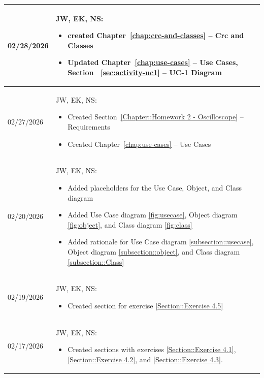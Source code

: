 \begin{longtable}{|l||p{13.5cm}|}
02/28/2026 & 
JW, EK, NS:
\begin{itemize}[topsep=0pt,itemsep=0pt,parsep=0pt,partopsep=0pt,leftmargin=12pt]
\item created Chapter~\ref{chap:crc-and-classes} -- Crc and Classes
\item Updated Chapter~\ref{chap:use-cases} -- Use Cases, Section ~\ref{sec:activity-uc1} -- UC-1 Diagram
\end{itemize}
\\ \hline

02/27/2026 & 
JW, EK, NS:
\begin{itemize}[topsep=0pt,itemsep=0pt,parsep=0pt,partopsep=0pt,leftmargin=12pt]
\item Created Section~\ref{Chapter::Homework 2 - Oscilloscope} -- Requirements
\item Created Chapter~\ref{chap:use-cases} -- Use Cases
\end{itemize}
\\ \hline

02/20/2026 & 
JW, EK, NS:
\begin{itemize}[topsep=0pt,itemsep=0pt,parsep=0pt,partopsep=0pt,leftmargin=12pt]
\item Added placeholders for the Use Case, Object, and Class diagram
\item Added Use Case diagram \ref{fig:usecase}, Object diagram \ref{fig:object}, and Class diagram \ref{fig:class}
\item Added rationale for Use Case diagram \ref{subsection::usecase}, Object diagram \ref{subsection::object}, and Class diagram \ref{subsection::Class}
\end{itemize}
\\ \hline

02/19/2026 & 
JW, EK, NS:
\begin{itemize}[topsep=0pt,itemsep=0pt,parsep=0pt,partopsep=0pt,leftmargin=12pt]
\item Created section for exercise \ref{Section::Exercise 4.5}

\end{itemize}
\\ \hline

02/17/2026 & 
JW, EK, NS:
\begin{itemize}[topsep=0pt,itemsep=0pt,parsep=0pt,partopsep=0pt,leftmargin=12pt]
\item Created sections with exercises  \ref{Section::Exercise 4.1}, \ref{Section::Exercise 4.2}, and \ref{Section::Exercise 4.3}.
\end{itemize}
\\ \hline


\end{longtable}
